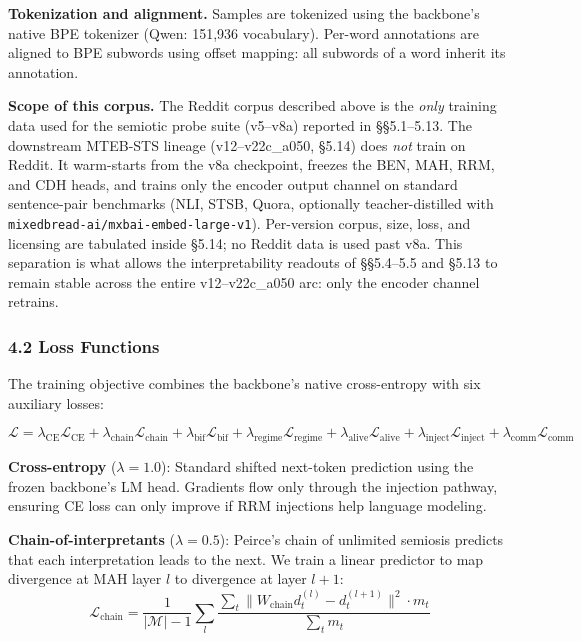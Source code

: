 \documentclass[
  11pt]{article}
\begin{document}
\textbf{Tokenization and alignment.} Samples are tokenized using the
backbone's native BPE tokenizer (Qwen: 151,936 vocabulary). Per-word
annotations are aligned to BPE subwords using offset mapping: all
subwords of a word inherit its annotation.

\textbf{Scope of this corpus.} The Reddit corpus described above is the
\emph{only} training data used for the semiotic probe suite (v5--v8a)
reported in §§5.1--5.13. The downstream MTEB-STS lineage
(v12--v22c\_a050, §5.14) does \emph{not} train on Reddit. It warm-starts
from the v8a checkpoint, freezes the BEN, MAH, RRM, and CDH heads, and
trains only the encoder output channel on standard sentence-pair
benchmarks (NLI, STSB, Quora, optionally teacher-distilled with
\texttt{mixedbread-ai/mxbai-embed-large-v1}). Per-version corpus, size,
loss, and licensing are tabulated inside §5.14; no Reddit data is used
past v8a. This separation is what allows the interpretability readouts
of §§5.4--5.5 and §5.13 to remain stable across the entire
v12--v22c\_a050 arc: only the encoder channel retrains.

\subsubsection{4.2 Loss Functions}\label{loss-functions}

The training objective combines the backbone's native cross-entropy with
six auxiliary losses:

\[\mathcal{L} = \lambda_{\text{CE}} \mathcal{L}_{\text{CE}} + \lambda_{\text{chain}} \mathcal{L}_{\text{chain}} + \lambda_{\text{bif}} \mathcal{L}_{\text{bif}} + \lambda_{\text{regime}} \mathcal{L}_{\text{regime}} + \lambda_{\text{alive}} \mathcal{L}_{\text{alive}} + \lambda_{\text{inject}} \mathcal{L}_{\text{inject}} + \lambda_{\text{comm}} \mathcal{L}_{\text{comm}}\]

\textbf{Cross-entropy} (\(\lambda = 1.0\)): Standard shifted next-token
prediction using the frozen backbone's LM head. Gradients flow only
through the injection pathway, ensuring CE loss can only improve if RRM
injections help language modeling.

\textbf{Chain-of-interpretants} (\(\lambda = 0.5\)): Peirce's chain of
unlimited semiosis predicts that each interpretation leads to the next.
We train a linear predictor to map divergence at MAH layer \(l\) to
divergence at layer \(l+1\):
\[\mathcal{L}_{\text{chain}} = \frac{1}{|\mathcal{M}|-1} \sum_{l} \frac{\sum_t \|W_{\text{chain}} d_t^{(l)} - d_t^{(l+1)}\|^2 \cdot m_t}{\sum_t m_t}\]
\end{document}
